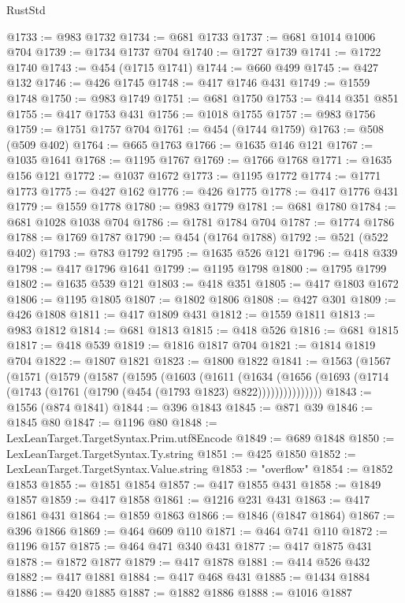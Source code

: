 \begin{lexlean}{RustStd}
\begin{coremodule}
{\begin{coremodule}
{{{{{{{{{{{{{{{{{{{{{{{{{{{{{{{{@1733 := @983 @1732
@1734 := @681 @1733
@1737 := @681 @1014 @1006 @704
@1739 := @1734 @1737 @704
@1740 := @1727 @1739
@1741 := @1722 @1740
@1743 := @454 (@1715 @1741)
@1744 := @660 @499
@1745 := @427 @132
@1746 := @426 @1745
@1748 := @417 @1746 @431
@1749 := @1559 @1748
@1750 := @983 @1749
@1751 := @681 @1750
@1753 := @414 @351 @851
@1755 := @417 @1753 @431
@1756 := @1018 @1755
@1757 := @983 @1756
@1759 := @1751 @1757 @704
@1761 := @454 (@1744 @1759)
@1763 := @508 (@509 @402)
@1764 := @665 @1763
@1766 := @1635 @146 @121
@1767 := @1035 @1641
@1768 := @1195 @1767
@1769 := @1766 @1768
@1771 := @1635 @156 @121
@1772 := @1037 @1672
@1773 := @1195 @1772
@1774 := @1771 @1773
@1775 := @427 @162
@1776 := @426 @1775
@1778 := @417 @1776 @431
@1779 := @1559 @1778
@1780 := @983 @1779
@1781 := @681 @1780
@1784 := @681 @1028 @1038 @704
@1786 := @1781 @1784 @704
@1787 := @1774 @1786
@1788 := @1769 @1787
@1790 := @454 (@1764 @1788)
@1792 := @521 (@522 @402)
@1793 := @783 @1792
@1795 := @1635 @526 @121
@1796 := @418 @339
@1798 := @417 @1796 @1641
@1799 := @1195 @1798
@1800 := @1795 @1799
@1802 := @1635 @539 @121
@1803 := @418 @351
@1805 := @417 @1803 @1672
@1806 := @1195 @1805
@1807 := @1802 @1806
@1808 := @427 @301
@1809 := @426 @1808
@1811 := @417 @1809 @431
@1812 := @1559 @1811
@1813 := @983 @1812
@1814 := @681 @1813
@1815 := @418 @526
@1816 := @681 @1815
@1817 := @418 @539
@1819 := @1816 @1817 @704
@1821 := @1814 @1819 @704
@1822 := @1807 @1821
@1823 := @1800 @1822
@1841 := @1563
    (@1567
      (@1571
        (@1579
          (@1587
            (@1595
              (@1603
                (@1611
                  (@1634
                    (@1656
                      (@1693 (@1714 (@1743 (@1761 (@1790 (@454 (@1793 @1823) @822)))))))))))))))
@1843 := @1556 (@874 @1841)
@1844 := @396 @1843
@1845 := @871 @39
@1846 := @1845 @80
@1847 := @1196 @80
@1848 := LexLeanTarget.TargetSyntax.Prim.utf8Encode
@1849 := @689 @1848
@1850 := LexLeanTarget.TargetSyntax.Ty.string
@1851 := @425 @1850
@1852 := LexLeanTarget.TargetSyntax.Value.string
@1853 := "overflow"
@1854 := @1852 @1853
@1855 := @1851 @1854
@1857 := @417 @1855 @431
@1858 := @1849 @1857
@1859 := @417 @1858
@1861 := @1216 @231 @431
@1863 := @417 @1861 @431
@1864 := @1859 @1863
@1866 := @1846 (@1847 @1864)
@1867 := @396 @1866
@1869 := @464 @609 @110
@1871 := @464 @741 @110
@1872 := @1196 @157
@1875 := @464 @471 @340 @431
@1877 := @417 @1875 @431
@1878 := @1872 @1877
@1879 := @417 @1878
@1881 := @414 @526 @432
@1882 := @417 @1881
@1884 := @417 @468 @431
@1885 := @1434 @1884
@1886 := @420 @1885
@1887 := @1882 @1886
@1888 := @1016 @1887
}}}}}}}}}}}}}}}}}}}}}}}}}}}}}}}}
\end{coremodule}}
\end{coremodule}
\end{lexlean}

